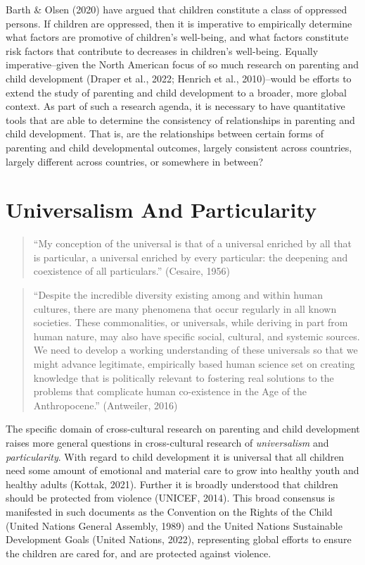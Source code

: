 \documentclass[
  letterpaper,
  DIV=11,
  numbers=noendperiod]{scrreprt}
\begin{document}
Barth \& Olsen (2020) have argued that children constitute a class of
oppressed persons. If children are oppressed, then it is imperative to
empirically determine what factors are promotive of children's
well-being, and what factors constitute risk factors that contribute to
decreases in children's well-being. Equally imperative--given the North
American focus of so much research on parenting and child development
(Draper et al., 2022; Henrich et al., 2010)--would be efforts to extend
the study of parenting and child development to a broader, more global
context. As part of such a research agenda, it is necessary to have
quantitative tools that are able to determine the consistency of
relationships in parenting and child development. That is, are the
relationships between certain forms of parenting and child developmental
outcomes, largely consistent across countries, largely different across
countries, or somewhere in between?

\section{Universalism And
Particularity}\label{universalism-and-particularity}

\begin{quote}
``My conception of the universal is that of a universal enriched by all
that is particular, a universal enriched by every particular: the
deepening and coexistence of all particulars.'' (Cesaire, 1956)
\end{quote}

\begin{quote}
``Despite the incredible diversity existing among and within human
cultures, there are many phenomena that occur regularly in all known
societies. These commonalities, or universals, while deriving in part
from human nature, may also have specific social, cultural, and systemic
sources. We need to develop a working understanding of these universals
so that we might advance legitimate, empirically based human science set
on creating knowledge that is politically relevant to fostering real
solutions to the problems that complicate human co-existence in the Age
of the Anthropocene.'' (Antweiler, 2016)
\end{quote}

The specific domain of cross-cultural research on parenting and child
development raises more general questions in cross-cultural research of
\emph{universalism} and \emph{particularity}.  With
regard to child development it is universal that all children need some
amount of emotional and material care to grow into healthy youth and
healthy adults (Kottak, 2021). Further it is broadly understood that
children should be protected from violence (UNICEF, 2014). This broad
consensus is manifested in such documents as the Convention on the
Rights of the Child (United Nations General Assembly, 1989) and the
United Nations Sustainable Development Goals (United Nations, 2022),
representing global efforts to ensure the children are cared for, and
are protected against violence.
\end{document}
